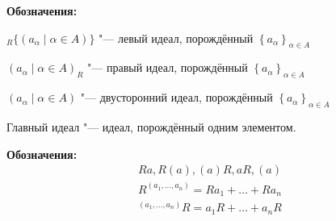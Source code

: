 \textbf{Обозначения:}

${}_R \{(a_\alpha \mid \alpha \in A)\}$ "--- левый идеал, порождённый $\left\{ a_\alpha \right\}_{\alpha \in A}$

$(a_\alpha \mid \alpha \in A)_R$ "--- правый идеал, порождённый $\left\{ a_\alpha \right\}_{\alpha \in A}$

$(a_\alpha \mid \alpha \in A)$ "--- двусторонний идеал, порождённый $\left\{ a_\alpha \right\}_{\alpha \in A}$

\begin{Def}
	Главный идеал "--- идеал, порождённый одним элементом.

	\textbf{Обозначения:} 
	\begin{gather*}
		Ra, R(a), (a)R, aR, (a) \\
		R^{(a_1, \dots, a_n)} = Ra_1 + \dots + Ra_n \\
		{}^{(a_1, \dots, a_n)}R = a_1R + \dots + a_nR
	\end{gather*}
\end{Def}

